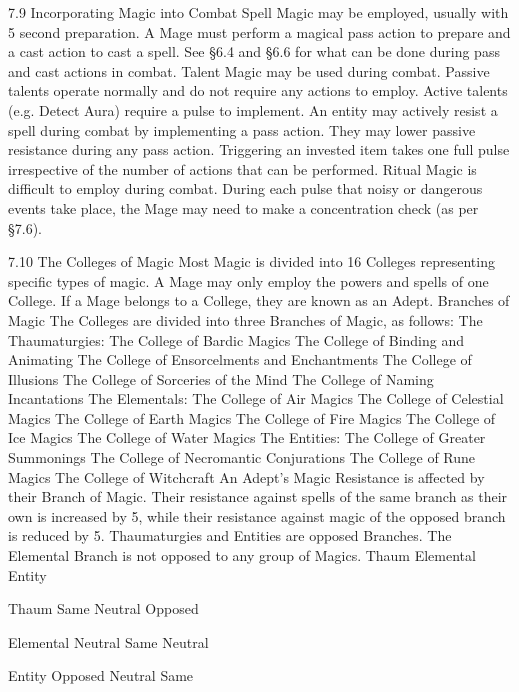 \documentclass[a4paper]{article}
\begin{document}
\begin{multicols}{3}
7.9 Incorporating Magic into Combat
Spell Magic may be employed, usually with 5
second preparation. A Mage must perform a magical pass action to prepare and a cast action to cast a
spell. See §6.4 and §6.6 for what can be done during pass and cast actions in combat.
Talent Magic may be used during combat. Passive
talents operate normally and do not require any
actions to employ. Active talents (e.g. Detect Aura)
require a pulse to implement. An entity may actively resist a spell during combat by implementing
a pass action. They may lower passive resistance
during any pass action. Triggering an invested item
takes one full pulse irrespective of the number of
actions that can be performed.
Ritual Magic is difficult to employ during combat.
During each pulse that noisy or dangerous events
take place, the Mage may need to make a concentration check (as per §7.6).

7.10 The Colleges of Magic
Most Magic is divided into 16 Colleges representing specific types of magic. A Mage may only
employ the powers and spells of one College. If a
Mage belongs to a College, they are known as an
Adept.
Branches of Magic
The Colleges are divided into three Branches of
Magic, as follows:
The Thaumaturgies:
The College of Bardic Magics
The College of Binding and Animating
The College of Ensorcelments and Enchantments
The College of Illusions
The College of Sorceries of the Mind The College
of Naming Incantations
The Elementals:
The College of Air Magics
The College of Celestial Magics
The College of Earth Magics
The College of Fire Magics
The College of Ice Magics
The College of Water Magics
The Entities:
The College of Greater Summonings
The College of Necromantic Conjurations
The College of Rune Magics
The College of Witchcraft
An Adept’s Magic Resistance is affected by their
Branch of Magic. Their resistance against spells of
the same branch as their own is increased by 5,
while their resistance against magic of the opposed
branch is reduced by 5. Thaumaturgies and Entities
are opposed Branches. The Elemental Branch is
not opposed to any group of Magics.
Thaum
Elemental
Entity

Thaum
Same
Neutral
Opposed

Elemental
Neutral
Same
Neutral

Entity
Opposed
Neutral
Same


\end{multicols}
\end{document}
